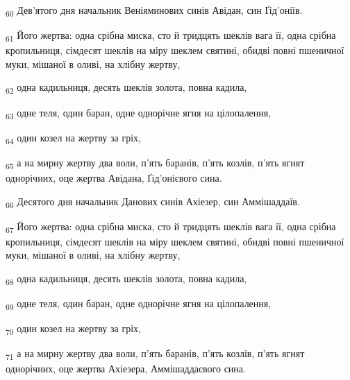 \begin{tcolorbox}
\textsubscript{60} Дев'ятого дня начальник Веніяминових синів Авідан, син Ґід'оніїв.
\end{tcolorbox}
\begin{tcolorbox}
\textsubscript{61} Його жертва: одна срібна миска, сто й тридцять шеклів вага її, одна срібна кропильниця, сімдесят шеклів на міру шеклем святині, обидві повні пшеничної муки, мішаної в оливі, на хлібну жертву,
\end{tcolorbox}
\begin{tcolorbox}
\textsubscript{62} одна кадильниця, десять шеклів золота, повна кадила,
\end{tcolorbox}
\begin{tcolorbox}
\textsubscript{63} одне теля, один баран, одне однорічне ягня на цілопалення,
\end{tcolorbox}
\begin{tcolorbox}
\textsubscript{64} один козел на жертву за гріх,
\end{tcolorbox}
\begin{tcolorbox}
\textsubscript{65} а на мирну жертву два воли, п'ять баранів, п'ять козлів, п'ять ягнят однорічних, оце жертва Авідана, Ґід'онієвого сина.
\end{tcolorbox}
\begin{tcolorbox}
\textsubscript{66} Десятого дня начальник Данових синів Ахіезер, син Аммішаддаїв.
\end{tcolorbox}
\begin{tcolorbox}
\textsubscript{67} Його жертва: одна срібна миска, сто й тридцять шеклів вага її, одна срібна кропильниця, сімдесят шеклів на міру шеклем святині, обидві повні пшеничної муки, мішаної в оливі, на хлібну жертву,
\end{tcolorbox}
\begin{tcolorbox}
\textsubscript{68} одна кадильниця, десять шеклів золота, повна кадила,
\end{tcolorbox}
\begin{tcolorbox}
\textsubscript{69} одне теля, один баран, одне однорічне ягня на цілопалення,
\end{tcolorbox}
\begin{tcolorbox}
\textsubscript{70} один козел на жертву за гріх,
\end{tcolorbox}
\begin{tcolorbox}
\textsubscript{71} а на мирну жертву два воли, п'ять баранів, п'ять козлів, п'ять ягнят однорічних, оце жертва Ахіезера, Аммішаддаєвого сина.
\end{tcolorbox}
